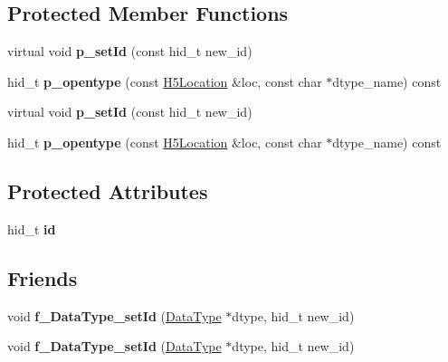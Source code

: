 \subsection*{Protected Member Functions}
\begin{DoxyCompactItemize}
\item 
\mbox{\label{class_h5_1_1_data_type_aa467c5fd8e0d1cfb2a470fb4c8824e1c}} 
virtual void {\bfseries p\+\_\+set\+Id} (const hid\+\_\+t new\+\_\+id)
\item 
\mbox{\label{class_h5_1_1_data_type_a25a7f512650785862c6005c2104a325c}} 
hid\+\_\+t {\bfseries p\+\_\+opentype} (const \hyperlink{class_h5_1_1_h5_location}{H5\+Location} \&loc, const char $\ast$dtype\+\_\+name) const
\item 
\mbox{\label{class_h5_1_1_data_type_aa467c5fd8e0d1cfb2a470fb4c8824e1c}} 
virtual void {\bfseries p\+\_\+set\+Id} (const hid\+\_\+t new\+\_\+id)
\item 
\mbox{\label{class_h5_1_1_data_type_a25a7f512650785862c6005c2104a325c}} 
hid\+\_\+t {\bfseries p\+\_\+opentype} (const \hyperlink{class_h5_1_1_h5_location}{H5\+Location} \&loc, const char $\ast$dtype\+\_\+name) const
\end{DoxyCompactItemize}
\subsection*{Protected Attributes}
\begin{DoxyCompactItemize}
\item 
\mbox{\label{class_h5_1_1_data_type_aa3ed12331c88117e640fff76002108d3}} 
hid\+\_\+t {\bfseries id}
\end{DoxyCompactItemize}
\subsection*{Friends}
\begin{DoxyCompactItemize}
\item 
\mbox{\label{class_h5_1_1_data_type_a65aad2c86b597a4b3c6b04811727455a}} 
void {\bfseries f\+\_\+\+Data\+Type\+\_\+set\+Id} (\hyperlink{class_h5_1_1_data_type}{Data\+Type} $\ast$dtype, hid\+\_\+t new\+\_\+id)
\item 
\mbox{\label{class_h5_1_1_data_type_a65aad2c86b597a4b3c6b04811727455a}} 
void {\bfseries f\+\_\+\+Data\+Type\+\_\+set\+Id} (\hyperlink{class_h5_1_1_data_type}{Data\+Type} $\ast$dtype, hid\+\_\+t new\+\_\+id)
\end{DoxyCompactItemize}
